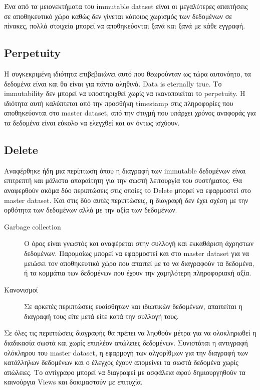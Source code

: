 Ένα από τα μειονεκτήματα του immutable dataset είναι οι μεγαλύτερες απαιτήσεις σε αποθηκευτικό χώρο καθώς δεν γίνεται κάποιος χωρισμός των δεδομένων σε πίνακες, πολλά στοιχεία μπορεί να αποθηκεύονται ξανά και ξανά με κάθε εγγραφή. 

\subsection{Perpetuity}
Η συγκεκριμένη ιδιότητα επιβεβαιώνει αυτό που θεωρούνταν ως τώρα αυτονόητο, τα δεδομένα είναι και θα είναι για πάντα αληθινά. Data is eternally true. Το immutability δεν μπορεί να υποστηριχθεί χωρίς να ικανοποιείται το perpetuity. Η ιδιότητα αυτή καλύπτεται από την προσθήκη timestamp στις πληροφορίες που αποθηκεύονται στο master dataset, από την στιγμή που υπάρχει χρόνος αναφοράς για τα δεδομένα είναι εύκολο να ελεγχθεί και αν όντως ισχύουν.

\subsection{Delete}
Αναφέρθηκε ήδη μια περίπτωση όπου η διαγραφή των immutable δεδομένων είναι επιτρεπτή και μάλιστα απαραίτητη για την σωστή λειτουργία του συστήματος. Θα αναφερθούν ακόμα δύο περιπτώσεις στις οποίες το Delete μπορεί να εφαρμοστεί στο master dataset. Και στις δύο αυτές περιπτώσεις, η διαγραφή δεν έχει σχέση με την ορθότητα των δεδομένων αλλά με την αξία των δεδομένων. 
\begin{description}
\item [Garbage collection] Ο όρος είναι γνωστός και αναφέρεται στην συλλογή και εκκαθάριση άχρηστων δεδομένων. Παρομοίως μπορεί να εφαρμοστεί και στο master dataset για να μειώσει τον αποθηκευτικό χώρο που απαιτεί με το να διαγραφούν τα δεδομένα, ή τα κομμάτια των δεδομένων που έχουν την χαμηλότερη πληροφοριακή αξία. 
\item [Κανονισμοί] Σε αρκετές περιπτώσεις ευαίσθητων και ιδιωτικών δεδομένων, απαιτείται η διαγραφή τους είτε μετά είτε κατά την συλλογή τους.
\end{description}

 Σε όλες τις περιπτώσεις διαγραφής θα πρέπει να ληφθούν μέτρα για να ολοκληρωθεί η διαδικασία σωστά και χωρίς επιπλέον απώλειες δεδομένων.
Συνιστάται η αντιγραφή ολόκληρου του master dataset, η εφαρμογή των αλγορίθμων για την διαγραφή των κατάλληλων δεδομένων και ο έλεγχος έχουν απομείνει τα σωστά δεδομένα χωρίς απώλειες. Το αντίγραφο μπορεί να διαγραφεί με ασφάλεια αφού δημιουργηθούν τα καινούργια Views και δοκιμαστούν με επιτυχία.
